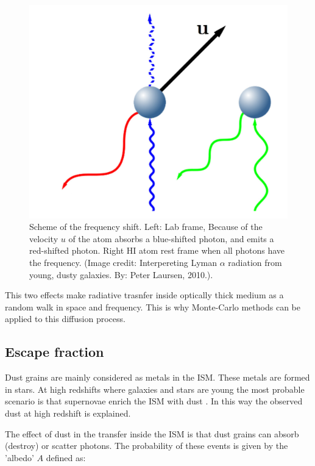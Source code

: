 \begin{figure}[H]
\begin{center}
\includegraphics[scale=0.4]{Figures/xshift.png}
\end{center}\caption{Scheme of the frequency shift. Left: Lab frame, Because 
of the velocity $u$ of the atom absorbs a blue-shifted \ly photon, and emits 
a red-shifted \ly photon. Right HI atom rest frame when all photons have the \ly frequency. (Image credit: Interpereting Lyman $\alpha$ radiation from young, dusty galaxies. By: Peter Laursen, 2010.).\label{fig:xshift}}
\end{figure}


This two effects make radiative trasnfer inside optically thick medium as a random 
walk in space and frequency. This is why Monte-Carlo methods can be
applied to this diffusion process.
 
\subsection{Escape fraction}\label{sec:ef}

Dust grains are mainly considered as metals in the ISM. These
metals are formed in stars. At high redshifts where galaxies and 
stars are young the most probable scenario is that supernovae 
enrich the ISM with dust \citep{Kotak09}. In this way the observed 
dust \citep{Coppin09}  at high redshift is explained. 

The effect of dust in the \ly transfer inside the ISM is that 
dust grains can absorb (destroy) or scatter \ly photons. The 
probability of these events is given by the 'albedo' $A$ defined as:

